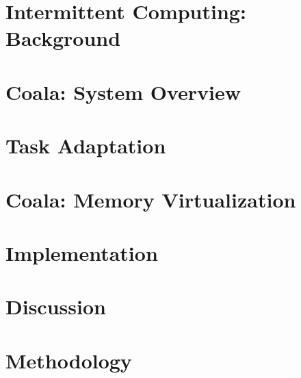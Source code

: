 \documentclass[acmsmall,review,anonymous]{acmart}\settopmatter{printfolios=true,printccs=false,printacmref=false}
\newcommand{\sys}{Coala\xspace}
\begin{document}


\section{Intermittent Computing: Background}
\label{sec:background}



\section{\sys: System Overview}
\label{sec:systemdescription}


\section{Task Adaptation}
\label{sec:task_adaptation}

%




\section{\sys: Memory Virtualization}
\label{sec:memory_virtulaization}




%

\section{Implementation}
\label{sec:implementation}


\section{Discussion}
\label{sec:discussion}



\section{Methodology}
\label{sec:methodology}
\end{document}
